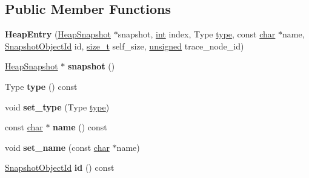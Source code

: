 \subsection*{Public Member Functions}
\begin{DoxyCompactItemize}
\item 
\mbox{\label{classv8_1_1internal_1_1HeapEntry_a1baff02546d2d3f32a8568404adc9c92}} 
{\bfseries Heap\+Entry} (\mbox{\hyperlink{classv8_1_1internal_1_1HeapSnapshot}{Heap\+Snapshot}} $\ast$snapshot, \mbox{\hyperlink{classint}{int}} index, Type \mbox{\hyperlink{classstd_1_1conditional_1_1type}{type}}, const \mbox{\hyperlink{classchar}{char}} $\ast$name, \mbox{\hyperlink{classuint32__t}{Snapshot\+Object\+Id}} id, \mbox{\hyperlink{classsize__t}{size\+\_\+t}} self\+\_\+size, \mbox{\hyperlink{classunsigned}{unsigned}} trace\+\_\+node\+\_\+id)
\item 
\mbox{\label{classv8_1_1internal_1_1HeapEntry_af592de683760c38f4318785b92ba16af}} 
\mbox{\hyperlink{classv8_1_1internal_1_1HeapSnapshot}{Heap\+Snapshot}} $\ast$ {\bfseries snapshot} ()
\item 
\mbox{\label{classv8_1_1internal_1_1HeapEntry_afd6c145a81759e90b101b3d826be8964}} 
Type {\bfseries type} () const
\item 
\mbox{\label{classv8_1_1internal_1_1HeapEntry_a93b23e65e577012a6184bda16bda4ad6}} 
void {\bfseries set\+\_\+type} (Type \mbox{\hyperlink{classstd_1_1conditional_1_1type}{type}})
\item 
\mbox{\label{classv8_1_1internal_1_1HeapEntry_a392c7b95816a7e8818fcc7df568984a9}} 
const \mbox{\hyperlink{classchar}{char}} $\ast$ {\bfseries name} () const
\item 
\mbox{\label{classv8_1_1internal_1_1HeapEntry_aa57e9ce86049417efcdc7245c87b7974}} 
void {\bfseries set\+\_\+name} (const \mbox{\hyperlink{classchar}{char}} $\ast$name)
\item 
\mbox{\label{classv8_1_1internal_1_1HeapEntry_a381a2ceaf83a8ced0a67de901c7eaa23}} 
\mbox{\hyperlink{classuint32__t}{Snapshot\+Object\+Id}} {\bfseries id} () const

\end{DoxyCompactItemize}
